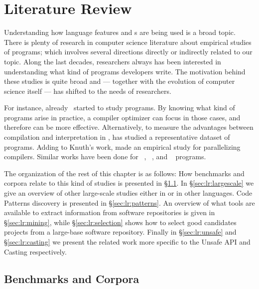 
\chapter{Literature Review}
\label{cha:literature-review}

Understanding how language features and \api{}s are being used is a broad topic.
There is plenty of research in computer science literature about empirical studies of programs; which involves several directions directly or indirectly related to our topic.
Along the last decades, researchers always has been interested in understanding what kind of programs developers write.
The motivation behind these studies is quite broad and --- together with the evolution of computer science itself --- has shifted to the needs of researchers.

For instance, already~\cite{knuthEmpiricalStudyFORTRAN1971} started to study \fortran{} programs.
By knowing what kind of programs arise in practice, a compiler optimizer can focus in those cases, and therefore can be more effective.
Alternatively, to measure the advantages between compilation and interpretation in \basic{}, \cite{hammondBASICEvaluationProcessing1977} has studied a representative dataset of programs.
Adding to Knuth's work, \cite{shenEmpiricalStudyFortran1990} made an empirical study for parallelizing compilers.
Similar works have been done for \cobol{}~\cite{salvadoriStaticProfileCOBOL1975,chevanceStaticProfileDynamic1978}, \pascal{}~\cite{cookContextualAnalysisPascal1982}, and \apl{}~\cite{saalPropertiesAPLPrograms1975,saalEmpiricalStudyAPL1977} programs. 

The organization of the rest of this chapter is as follows: 
How benchmarks and corpora relate to this kind of studies is presented in \S\ref{sec:lr:benchmarks}.
In \S\ref{sec:lr:largescale} we give an overview of other large-scale studies either in \java{} or in other languages.
Code Patterns discovery is presented in \S\ref{sec:lr:patterns}.
An overview of what tools are available to extract information from software repositories is given in \S\ref{sec:lr:mining},
while \S\ref{sec:lr:selection} shows how to select good candidates projects from a large-base software repository.
Finally in \S\ref{sec:lr:unsafe} and \S\ref{sec:lr:casting} we present the related work more specific to the Unsafe API and Casting respectively.

\section{Benchmarks and Corpora}
\label{sec:lr:benchmarks}

